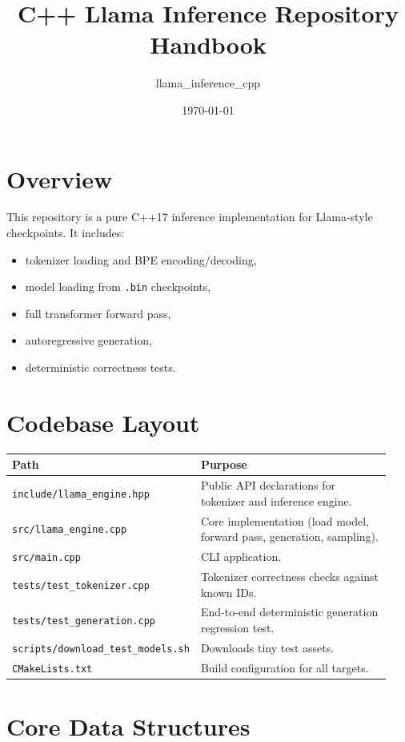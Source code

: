 \documentclass[11pt]{article}
\title{C++ Llama Inference Repository Handbook}
\author{llama\_inference\_cpp}
\date{\today}
\begin{document}
\maketitle
\tableofcontents
\newpage

\section{Overview}
This repository is a pure C++17 inference implementation for Llama-style checkpoints.
It includes:
\begin{itemize}[leftmargin=*]
  \item tokenizer loading and BPE encoding/decoding,
  \item model loading from \texttt{.bin} checkpoints,
  \item full transformer forward pass,
  \item autoregressive generation,
  \item deterministic correctness tests.
\end{itemize}

\section{Codebase Layout}
\begin{longtable}{p{0.24\linewidth} p{0.7\linewidth}}
\toprule
\textbf{Path} & \textbf{Purpose} \\
\midrule
\endhead
\texttt{include/llama\_engine.hpp} & Public API declarations for tokenizer and inference engine. \\
\texttt{src/llama\_engine.cpp} & Core implementation (load model, forward pass, generation, sampling). \\
\texttt{src/main.cpp} & CLI application. \\
\texttt{tests/test\_tokenizer.cpp} & Tokenizer correctness checks against known IDs. \\
\texttt{tests/test\_generation.cpp} & End-to-end deterministic generation regression test. \\
\texttt{scripts/download\_test\_models.sh} & Downloads tiny test assets. \\
\texttt{CMakeLists.txt} & Build configuration for all targets. \\
\bottomrule
\end{longtable}

\section{Core Data Structures}
\end{document}
